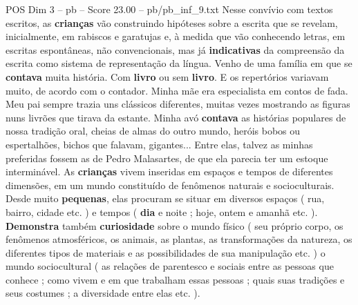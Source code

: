 \begin{textsample}{POS Dim 3 – pb – Score 23.00 – pb/pb\_inf\_9.txt}
Nesse convívio com textos escritos, as \textbf{crianças} vão construindo hipóteses sobre a escrita que se revelam, inicialmente, em rabiscos e garatujas e, à medida que vão conhecendo letras, em escritas espontâneas, não convencionais, mas já \textbf{indicativas} da compreensão da escrita como sistema de representação da língua.
Venho de uma família em que se \textbf{contava} muita história.
Com \textbf{livro} ou sem \textbf{livro}.
E os repertórios variavam muito, de acordo com o contador.
Minha mãe era especialista em contos de fada.
Meu pai sempre trazia uns clássicos diferentes, muitas vezes mostrando as figuras nuns livrões que tirava da estante.
Minha avó \textbf{contava} as histórias populares de nossa tradição oral, cheias de almas do outro mundo, heróis bobos ou espertalhões, bichos que falavam, gigantes...
Entre elas, talvez as minhas preferidas fossem as de Pedro Malasartes, de que ela parecia ter um estoque interminável.
As \textbf{crianças} vivem inseridas em espaços e tempos de diferentes dimensões, em um mundo constituído de fenômenos naturais e socioculturais.
Desde muito \textbf{pequenas}, elas procuram se situar em diversos espaços ( rua, bairro, cidade etc. ) e tempos ( \textbf{dia} e noite ; hoje, ontem e amanhã etc. ). \textbf{Demonstra} também \textbf{curiosidade} sobre o mundo físico ( seu próprio corpo, os fenômenos atmosféricos, os animais, as plantas, as transformações da natureza, os diferentes tipos de materiais e as possibilidades de sua manipulação etc. ) o mundo sociocultural ( as relações de parentesco e sociais entre as pessoas que conhece ; como vivem e em que trabalham essas pessoas ; quais suas tradições e seus costumes ; a diversidade entre elas etc. ).

\end{textsample}

